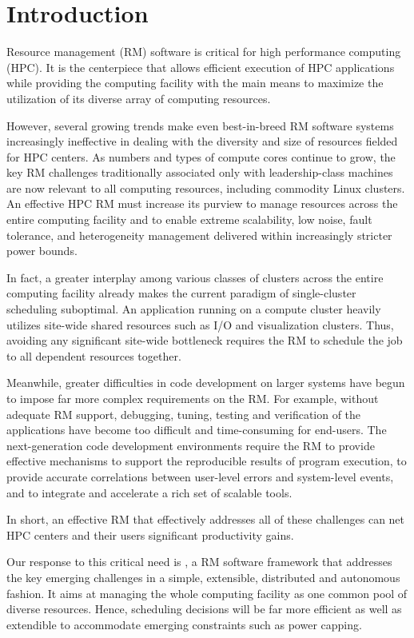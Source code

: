 \section{Introduction}

Resource management (RM) software is critical
for high performance computing (HPC).
It is the centerpiece that allows efficient
execution of HPC applications while providing
the computing facility with the main means
to maximize the utilization of its diverse array of computing
resources.

However, several growing trends make even
best-in-breed RM software systems increasingly ineffective
in dealing with the diversity and size of resources fielded for HPC centers.
As numbers and types of compute cores
continue to grow, the key RM challenges traditionally associated only
with leadership-class machines are now
relevant to all computing resources, including
commodity Linux clusters. An effective HPC RM must increase
its purview to manage resources across the entire
computing facility and to enable extreme scalability,
low noise, fault tolerance,
and heterogeneity management delivered within increasingly
stricter power bounds.

In fact, a greater interplay among various classes
of clusters across the entire computing facility already 
makes the current paradigm of single-cluster scheduling
suboptimal. An application running on a compute
cluster heavily utilizes site-wide shared resources
such as I/O and visualization clusters.
Thus, avoiding any significant site-wide bottleneck
requires the RM to schedule the job to all dependent
resources together.

Meanwhile, greater difficulties in code development
on larger systems have begun to impose far more complex
requirements on the RM. For example, without adequate
RM support, debugging, tuning, testing and verification
of the applications have become too difficult
and time-consuming for end-users.
The next-generation code development environments
require the RM to provide effective mechanisms
to support the reproducible results of program execution,
to provide accurate correlations between user-level errors
and system-level events,
and to integrate and accelerate a rich set of scalable tools.

In short, an effective RM that effectively
addresses all of these challenges can net HPC centers
and their users significant productivity gains.

Our response to this critical need is \flux,
a RM software framework that addresses the key emerging
challenges in a simple, extensible, distributed
and autonomous fashion.
It aims at managing the whole computing facility
as one common pool of diverse resources.
Hence, scheduling decisions will be far more efficient
as well as extendible to accommodate emerging constraints
such as power capping.

